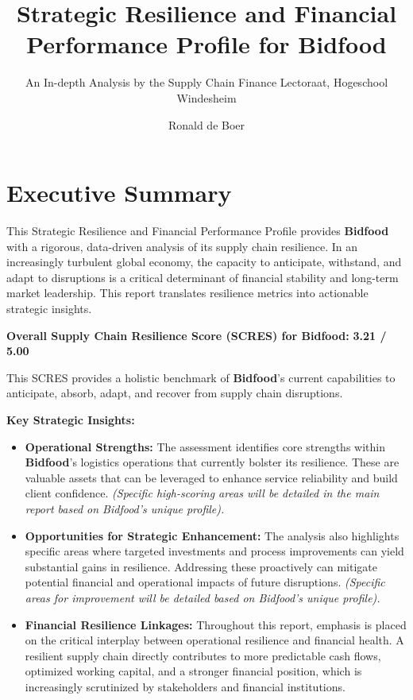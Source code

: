 \documentclass[
  oneside,
  open=any,
  fontsize=11pt]{scrbook}
\title{Strategic Resilience and Financial Performance Profile for
Bidfood}
\subtitle{An In-depth Analysis by the Supply Chain Finance Lectoraat,
Hogeschool Windesheim}
\author{Ronald de Boer}
\date{}
\providecommand{\tightlist}{%
  \setlength{\itemsep}{0pt}\setlength{\parskip}{0pt}}
\renewcommand*\contentsname{Table of contents}
\newcommand\contentsname{Table of contents}
\begin{document}
\frontmatter
\maketitle

\renewcommand*\contentsname{Table of contents}
{
\setcounter{tocdepth}{2}
\tableofcontents
}
\listoffigures
\listoftables

\mainmatter
\newpage

\chapter{Executive Summary}\label{executive-summary}

This Strategic Resilience and Financial Performance Profile provides
\textbf{Bidfood} with a rigorous, data-driven analysis of its supply
chain resilience. In an increasingly turbulent global economy, the
capacity to anticipate, withstand, and adapt to disruptions is a
critical determinant of financial stability and long-term market
leadership. This report translates resilience metrics into actionable
strategic insights.

\textbf{Overall Supply Chain Resilience Score (SCRES) for Bidfood:}
\textbf{3.21 / 5.00}

This SCRES provides a holistic benchmark of \textbf{Bidfood}'s current
capabilities to anticipate, absorb, adapt, and recover from supply chain
disruptions.

\textbf{Key Strategic Insights:}

\begin{itemize}
\tightlist
\item
  \textbf{Operational Strengths:} The assessment identifies core
  strengths within \textbf{Bidfood}'s logistics operations that
  currently bolster its resilience. These are valuable assets that can
  be leveraged to enhance service reliability and build client
  confidence. \emph{(Specific high-scoring areas will be detailed in the
  main report based on Bidfood's unique profile).}
\item
  \textbf{Opportunities for Strategic Enhancement:} The analysis also
  highlights specific areas where targeted investments and process
  improvements can yield substantial gains in resilience. Addressing
  these proactively can mitigate potential financial and operational
  impacts of future disruptions. \emph{(Specific areas for improvement
  will be detailed based on Bidfood's unique profile).}
\item
  \textbf{Financial Resilience Linkages:} Throughout this report,
  emphasis is placed on the critical interplay between operational
  resilience and financial health. A resilient supply chain directly
  contributes to more predictable cash flows, optimized working capital,
  and a stronger financial position, which is increasingly scrutinized
  by stakeholders and financial institutions.
\end{itemize}
\end{document}
